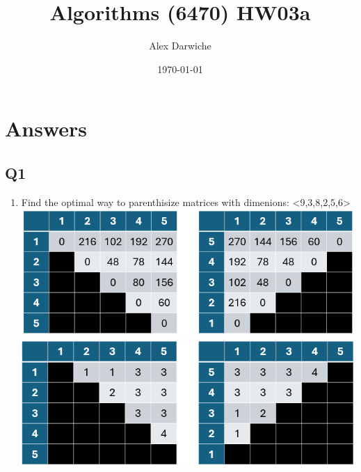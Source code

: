 \documentclass{article}
\title{Algorithms (6470) HW03a}
\author{Alex Darwiche}
\date{\today}
\begin{document}
\maketitle

\section*{Answers}

\subsection*{Q1}
\begin{enumerate}[label=(\alph*)]
    \item Find the optimal way to parenthisize matrices with dimenions: <9,3,8,2,5,6>
    \subitem \includegraphics[width=1\textwidth]{tableM.png}
    \subitem \includegraphics[width=1\textwidth]{tableS.png}

\end{enumerate}

\end{document}
